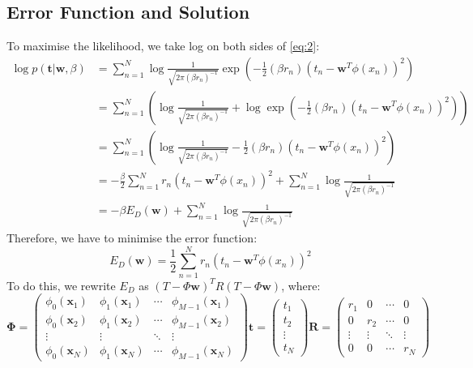 \documentclass[a4paper, 11pt]{article}
\begin{document}
\subsection{Error Function and Solution}
To maximise the likelihood, we take log on both sides of \ref{eq:2}:
    \begin{align*}
        \log p(\textbf{t}|\textbf{w}, \beta) &= \sum_{n=1}^{N} \log \frac{1}{\sqrt{2\pi (\beta r_n)^{-1}}} \exp\left(-\frac{1}{2}(\beta r_n)(t_n - \textbf{w}^T \phi(x_n))^2\right) \\
        &= \sum_{n=1}^{N} \left(\log \frac{1}{\sqrt{2\pi (\beta r_n)^{-1}}} + \log \exp\left(-\frac{1}{2}(\beta r_n)(t_n - \textbf{w}^T \phi(x_n))^2\right)\right) \\
        &= \sum_{n=1}^{N} \left(\log \frac{1}{\sqrt{2\pi (\beta r_n)^{-1}}} - \frac{1}{2}(\beta r_n)(t_n - \textbf{w}^T \phi(x_n))^2\right) \\
        &= - \frac{\beta}{2}\sum_{n=1}^{N}r_n(t_n - \textbf{w}^T \phi(x_n))^2 + \sum_{n=1}^{N} \log \frac{1}{\sqrt{2\pi (\beta r_n)^{-1}}} \\
        &= - \beta E_D(\textbf{w}) + \sum_{n=1}^{N} \log \frac{1}{\sqrt{2\pi (\beta r_n)^{-1}}} 
    \end{align*}
Therefore, we have to minimise the error function:
$$E_D(\textbf{w}) = \frac{1}{2}\sum_{n=1}^{N}r_n(t_n - \textbf{w}^T \phi(x_n))^2$$
To do this, we rewrite $E_D$ as $(T-\Phi\textbf{w})^T R (T-\Phi\textbf{w})$, where:
$$\mathbf{\Phi}=\left(\begin{array}{cccc}
    \phi_0\left(\mathbf{x}_1\right) & \phi_1\left(\mathbf{x}_1\right) & \cdots & \phi_{M-1}\left(\mathbf{x}_1\right) \\
    \phi_0\left(\mathbf{x}_2\right) & \phi_1\left(\mathbf{x}_2\right) & \cdots & \phi_{M-1}\left(\mathbf{x}_2\right) \\
    \vdots & \vdots & \ddots & \vdots \\
    \phi_0\left(\mathbf{x}_N\right) & \phi_1\left(\mathbf{x}_N\right) & \cdots & \phi_{M-1}\left(\mathbf{x}_N\right)
    \end{array}\right)
    \mathbf{t}=\left(\begin{array}{c}
    t_1 \\
    t_2 \\
    \vdots \\
    t_N
    \end{array}\right)
    \mathbf{R}=\left(\begin{array}{cccc}
    r_1 & 0 & \cdots & 0 \\
    0 & r_2 & \cdots & 0 \\
    \vdots & \vdots & \ddots & \vdots \\
    0 & 0 & \cdots & r_N
    \end{array}\right)
$$
\end{document}
